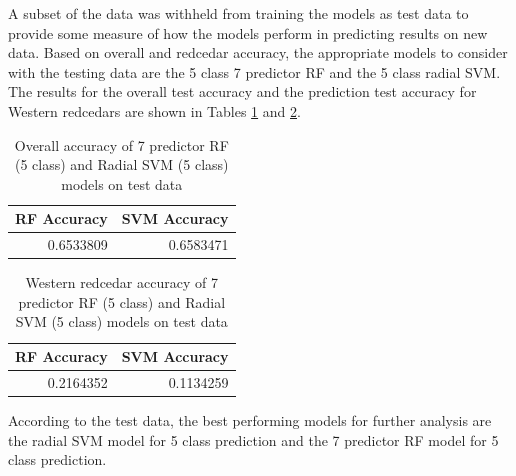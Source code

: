 \documentclass[12pt,twoside]{reedthesis}
\begin{document}
A subset of the data was withheld from training the models as test data to provide some measure of how the models perform in predicting results on new data. Based on overall and redcedar accuracy, the appropriate models to consider with the testing data are the 5 class 7 predictor RF and the 5 class radial SVM. The results for the overall test accuracy and the prediction test accuracy for Western redcedars are shown in Tables \ref{tab:resultsTest} and \ref{tab:resultsTest2}.
\begin{table}

\caption{\label{tab:resultsTest}Overall accuracy of 7 predictor RF (5 class) and Radial SVM (5 class) models on test data}
\centering
\begin{tabular}[t]{r|r}
\hline
RF Accuracy & SVM Accuracy\\
\hline
0.6533809 & 0.6583471\\
\hline
\end{tabular}
\end{table}
\begin{table}

\caption{\label{tab:resultsTest2}Western redcedar accuracy of 7 predictor RF (5 class) and Radial SVM (5 class) models on test data}
\centering
\begin{tabular}[t]{r|r}
\hline
RF Accuracy & SVM Accuracy\\
\hline
0.2164352 & 0.1134259\\
\hline
\end{tabular}
\end{table}
According to the test data, the best performing models for further analysis are the radial SVM model for 5 class prediction and the 7 predictor RF model for 5 class prediction.
\end{document}
